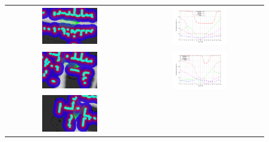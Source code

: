 \begin{figure}[h!]
\begin{tabular}{cc}
\includegraphics[width=0.45\textwidth]{example4} &
\includegraphics[width=0.45\textwidth,trim=50 40 80 60,clip]{costs4}\label{fig:cp07_example3}\\
\includegraphics[width=0.45\textwidth]{example14} &
\includegraphics[width=0.45\textwidth,trim=50 40 80 60,clip]{costs14}\label{fig:cp07_example6}\\
\includegraphics[width=0.45\textwidth]{example17} &

\end{tabular}
\end{figure}
